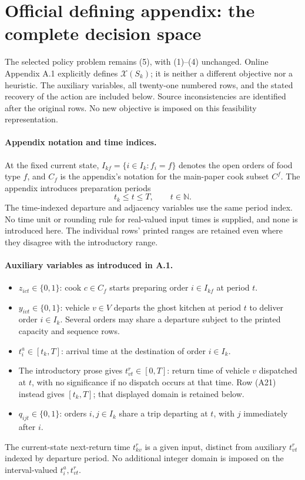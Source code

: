 \documentclass{article}
\begin{document}
\section*{Official defining appendix: the complete decision space}

The selected policy problem remains (5), with (1)--(4) unchanged. Online Appendix A.1 explicitly defines \(\mathcal X(S_k)\); it is neither a different objective nor a heuristic. The auxiliary variables, all twenty-one numbered rows, and the stated recovery of the action are included below. Source inconsistencies are identified after the original rows. No new objective is imposed on this feasibility representation.

\paragraph{Appendix notation and time indices.}
At the fixed current state, \(I_{kf}=\{i\in I_k:f_i=f\}\) denotes the open orders of food type \(f\), and \(C_f\) is the appendix's notation for the main-paper cook subset \(C^f\). The appendix introduces preparation periods
\[
t_k\leq t\leq T,\qquad t\in\mathbb N.
\]
The time-indexed departure and adjacency variables use the same period index. No time unit or rounding rule for real-valued input times is supplied, and none is introduced here. The individual rows' printed ranges are retained even where they disagree with the introductory range.

\paragraph{Auxiliary variables as introduced in A.1.}
\begin{itemize}
\item \(z_{ict}\in\{0,1\}\): cook \(c\in C_f\) starts preparing order \(i\in I_{kf}\) at period \(t\).
\item \(y_{ivt}\in\{0,1\}\): vehicle \(v\in V\) departs the ghost kitchen at period \(t\) to deliver order \(i\in I_k\). Several orders may share a departure subject to the printed capacity and sequence rows.
\item \(t_i^a\in[t_k,T]\): arrival time at the destination of order \(i\in I_k\).
\item The introductory prose gives \(t_{vt}^r\in[0,T]\): return time of vehicle \(v\) dispatched at \(t\), with no significance if no dispatch occurs at that time. Row (A21) instead gives \([t_k,T]\); that displayed domain is retained below.
\item \(q_{ijt}\in\{0,1\}\): orders \(i,j\in I_k\) share a trip departing at \(t\), with \(j\) immediately after \(i\).
\end{itemize}
The current-state next-return time \(t_{kv}^r\) is a given input, distinct from auxiliary \(t_{vt}^r\) indexed by departure period. No additional integer domain is imposed on the interval-valued \(t_i^a,t_{vt}^r\).
\end{document}
